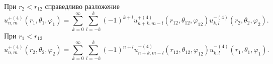 \begin{theorem}
При ${r_2} < {r_{12}}$ справедливо разложение
\begin{equation}\label{eq:1:15}
u_{n,m}^{ + (4)}\left( {{r_1},{\theta _1},{\varphi _1}} \right) = \sum\limits_{k = 0}^\infty  {\sum\limits_{l =  - k}^k {{{( - 1)}^{k + l}}} } u_{n + k,m - l}^{ + (4)}\left( {{r_{12}},{\theta _{12}},{\varphi _{12}}} \right)u_{k,l}^{ - (4)}\left( {{r_2},{\theta _2},{\varphi _2}} \right).
\end{equation}
При  ${r_1} < {r_{12}}$
\begin{equation}
u_{n,m}^{ + (4)}\left( {{r_2},{\theta _2},{\varphi _2}} \right) = \sum\limits_{k = 0}^\infty  {\sum\limits_{l =  - k}^k {{{( - 1)}^{n + l}}} } u_{n + k,m - l}^{ + (4)}\left( {{r_{12}},{\theta _{12}},{\varphi _{12}}} \right)u_{k,l}^{ - (4)}\left( {{r_1},{\theta _1},{\varphi _1}} \right).
\label{eq:1:16a}
\end{equation}
\end{theorem}
%
%
%
%
